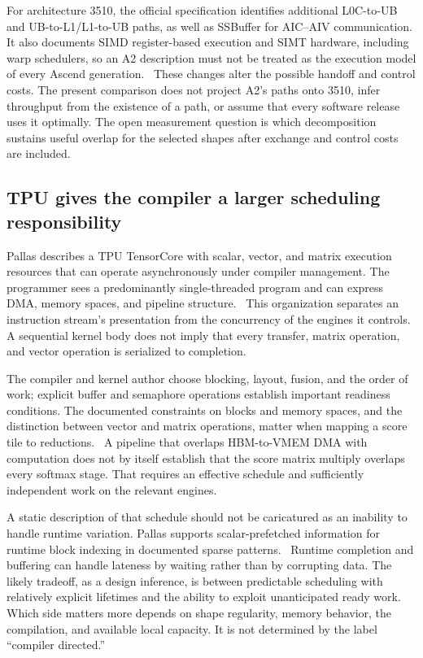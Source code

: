 For architecture 3510, the official specification identifies additional L0C-to-UB and UB-to-L1/L1-to-UB paths, as well as SSBuffer for AIC--AIV communication. It also documents SIMD register-based execution and SIMT hardware, including warp schedulers, so an A2 description must not be treated as the execution model of every Ascend generation.~\citep{u001-ascend-3510} These changes alter the possible handoff and control costs. The present comparison does not project A2's paths onto 3510, infer throughput from the existence of a path, or assume that every software release uses it optimally. The open measurement question is which decomposition sustains useful overlap for the selected shapes after exchange and control costs are included.

\subsection{TPU gives the compiler a larger scheduling responsibility}

Pallas describes a TPU TensorCore with scalar, vector, and matrix execution resources that can operate asynchronously under compiler management. The programmer sees a predominantly single-threaded program and can express DMA, memory spaces, and pipeline structure.~\citep{u001-pallas-pipeline} This organization separates an instruction stream's presentation from the concurrency of the engines it controls. A sequential kernel body does not imply that every transfer, matrix operation, and vector operation is serialized to completion.

The compiler and kernel author choose blocking, layout, fusion, and the order of work; explicit buffer and semaphore operations establish important readiness conditions. The documented constraints on blocks and memory spaces, and the distinction between vector and matrix operations, matter when mapping a score tile to reductions.~\citep{u001-pallas-details} A pipeline that overlaps HBM-to-VMEM DMA with computation does not by itself establish that the score matrix multiply overlaps every softmax stage. That requires an effective schedule and sufficiently independent work on the relevant engines.

A static description of that schedule should not be caricatured as an inability to handle runtime variation. Pallas supports scalar-prefetched information for runtime block indexing in documented sparse patterns.~\citep{u001-pallas-sparse} Runtime completion and buffering can handle lateness by waiting rather than by corrupting data. The likely tradeoff, as a design inference, is between predictable scheduling with relatively explicit lifetimes and the ability to exploit unanticipated ready work. Which side matters more depends on shape regularity, memory behavior, the compilation, and available local capacity. It is not determined by the label ``compiler directed.''

